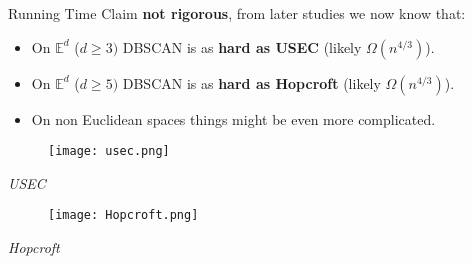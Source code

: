 \documentclass[aspectratio=169]{beamer}
\begin{document}
\begin{frame}{Running Time}
    Claim \textbf{not rigorous}, from later studies we now know that:
    \begin{itemize}
        \item On $\mathbb{E}^d$ ($d\ge3)$ DBSCAN is as \textbf{hard as USEC} (likely $\Omega(n^{4/3})$).
        \item On $\mathbb{E}^d$ ($d\ge5)$ DBSCAN is as \textbf{hard as Hopcroft} (likely $\Omega(n^{4/3})$).
        \item On non Euclidean spaces things might be even more complicated.
    \end{itemize}

\vspace{0.5cm}

    \begin{minipage}[c]{0.45\textwidth}
        \begin{figure}
            \centering
            \texttt{[image: usec.png]}
        \end{figure}
        \begin{center}
            \footnotesize\textit{USEC}
        \end{center}
    \end{minipage}
    \hfill
    \begin{minipage}[c]{0.45\textwidth}
        \begin{figure}
            \centering
            \texttt{[image: Hopcroft.png]}
        \end{figure}
        \begin{center}
            \footnotesize\textit{Hopcroft}
        \end{center}
    \end{minipage}
    
    
\end{frame}
\end{document}
